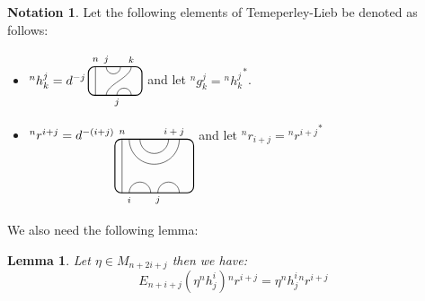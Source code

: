 \documentclass[11pt]{article}
\theoremstyle{plain}
\newtheorem{lem}[thm]{Lemma}
\theoremstyle{definition}
\newtheorem{nota}[thm]{Notation}
\newcommand{\des}[1]{\marginpar{\tiny \textcolor{purple}{DJC: #1}}}
\begin{document}
\begin{nota}
Let the following elements of Temeperley-Lieb be denoted as follows:
	\begin{itemize}
		\item $ {}^nh^j_k= d^{-j}\,
	\begin{tikzpicture}[baseline = .3cm]
	\draw[thick, rounded corners = 5pt] (0,0) rectangle (1.5,.8);
	\draw (.2,0) -- (.2,.8);
	\draw (.5,.8) arc (-180:0:.2cm);
	\draw (.5,0) .. controls ++(90:.3cm) and ++(270:.3cm) .. (1.2,.8);
	\draw (.8,0) arc (180:0:.2cm);
	\node at (.2,1) {\scriptsize{$n$}};
	\node at (.5,1) {\scriptsize{$j$}};
	\node at (1.2,1) {\scriptsize{$k$}};
	\node at (.8,-.2) {\scriptsize{$j$}};
	\end{tikzpicture}$ and let ${}^n g^j_k = {{}^n h^j_k}^{\ast}$.
	\item ${}^n r^{i+j}=d^{-(i+j)}\begin{tikzpicture}[baseline=0, yscale = -1]
	\draw[thick, rounded corners = 5pt] (0,0) rectangle (2.2,1.5);
	\draw (.2,0) -- (.2,1.5);
	\draw (0.4,0) arc (180:0:.7);
    \draw (0.7,0) arc (180:0:.4);
    \draw (0.4,1.5) arc (-180:0:.3);
      \draw (1.2,1.5) arc (-180:0:.3);
      \node at (.2,-.2) {\scriptsize{$n$}};
      \node at (1.65,-.2) {\scriptsize{$i+j$}};
     \node at (.4,1.7) {\scriptsize{$i$}};
      \node at (1.2,1.7) {\scriptsize{$j$}};
	\end{tikzpicture}$ and let ${}^n r_{i+j}= {{}^n r^{i+j}}^{\ast}$
	\end{itemize}
\end{nota}	

 We also need the following lemma:

 \begin{lem}\label{LeftKink}
Let $\eta \in M_{n+2i+j}$ then we have:
$$E_{n+i+j}(\eta {}^nh^i_j){}^n r^{i+j}= \eta {}^nh^i_j{}^n r^{i+j}$$
\end{lem}
\des{I'm not being careful about the factor of d at all right now I need to fix that later.}
\end{document}
